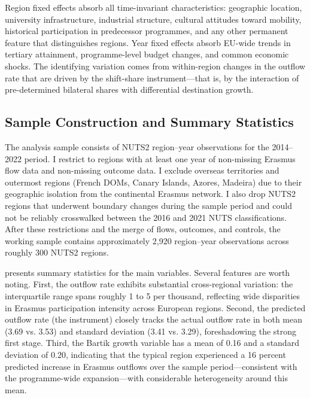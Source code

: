 \documentclass[12pt]{article}
\begin{document}
Region fixed effects absorb all time-invariant characteristics: geographic location, university infrastructure, industrial structure, cultural attitudes toward mobility, historical participation in predecessor programmes, and any other permanent feature that distinguishes regions. Year fixed effects absorb EU-wide trends in tertiary attainment, programme-level budget changes, and common economic shocks. The identifying variation comes from within-region changes in the outflow rate that are driven by the shift-share instrument---that is, by the interaction of pre-determined bilateral shares with differential destination growth.

\subsection{Sample Construction and Summary Statistics}

The analysis sample consists of NUTS2 region--year observations for the 2014--2022 period. I restrict to regions with at least one year of non-missing Erasmus flow data and non-missing outcome data. I exclude overseas territories and outermost regions (French DOMs, Canary Islands, Azores, Madeira) due to their geographic isolation from the continental Erasmus network. I also drop NUTS2 regions that underwent boundary changes during the sample period and could not be reliably crosswalked between the 2016 and 2021 NUTS classifications. After these restrictions and the merge of flows, outcomes, and controls, the working sample contains approximately 2,920 region--year observations across roughly 300 NUTS2 regions.

 presents summary statistics for the main variables. Several features are worth noting. First, the outflow rate exhibits substantial cross-regional variation: the interquartile range spans roughly 1 to 5 per thousand, reflecting wide disparities in Erasmus participation intensity across European regions. Second, the predicted outflow rate (the instrument) closely tracks the actual outflow rate in both mean (3.69 vs. 3.53) and standard deviation (3.41 vs. 3.29), foreshadowing the strong first stage. Third, the Bartik growth variable has a mean of 0.16 and a standard deviation of 0.20, indicating that the typical region experienced a 16 percent predicted increase in Erasmus outflows over the sample period---consistent with the programme-wide expansion---with considerable heterogeneity around this mean.

\begin{table}[H]
\centering
\caption{Summary Statistics}
\label{tab:summary}

\end{table}
\end{document}
